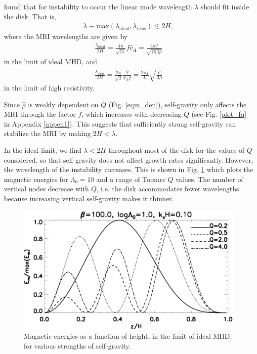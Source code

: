 \cite{sano99} found that for instability to occur the linear mode
wavelength $\lambda$ should fit inside the disk. That is,   
\begin{align}\label{sano_crit}
  \lambda \equiv
  \mathrm{max}\left(\lambda_\mathrm{ideal},\lambda_\mathrm{resis}\right)\lesssim
  2H, 
\end{align}
where the MRI wavelengths are given by 
\begin{align}\label{lambda_ideal}
  \frac{\lambda_\mathrm{ideal}}{2H} = \frac{4\pi}{\sqrt{15}} f \hat{v}_A =
  \frac{4\pi f}{\sqrt{15\beta\hat{\rho}}}
\end{align}
in the limit of ideal MHD, and 
\begin{align}\label{lambda_resis}
  \frac{\lambda_\mathrm{resis}}{2H} = \frac{2\pi}{\sqrt{3}}\frac{\hat{\eta}}{\hat{v}_A f} =
  \frac{2\pi f}{\Lambda_0}\sqrt{\frac{\hat{\rho}}{3\beta}} 
\end{align}
in the limit of high resistivity.  
   
Since $\hat{\rho}$ is weakly dependent
on $Q$ (Fig. \ref{eqm_den}), self-gravity only affects the
MRI through the factor $f$, which increases with decreasing $Q$ (see
Fig. \ref{plot_fq} in Appendix \ref{appen1}). This suggests that
sufficiently strong self-gravity can stabilize the MRI by making
$ 2H<\lambda $. 
 

In the ideal limit, we find $\lambda < 2H$ throughout most of the disk
for the values of $Q$ considered, so that self-gravity does not affect
growth rates significantly. However, the wavelength of the instability
increases. This is shown in Fig. \ref{compare_result_lambda10} which
plots the magnetic energies for $\Lambda_0=10$ and a range of Toomre $Q$
values. The number of vertical nodes decrease with $Q$, 
i.e. the disk accommodates fewer wavelengths because increasing
vertical self-gravity makes it thinner. 


\begin{figure}
  \includegraphics[width=\linewidth]{figures/compare_result_lambda10}
  \caption{Magnetic energies as a function of height, in the limit of
    ideal MHD, for various strengths of self-gravity.   
    \label{compare_result_lambda10}}
\end{figure}

